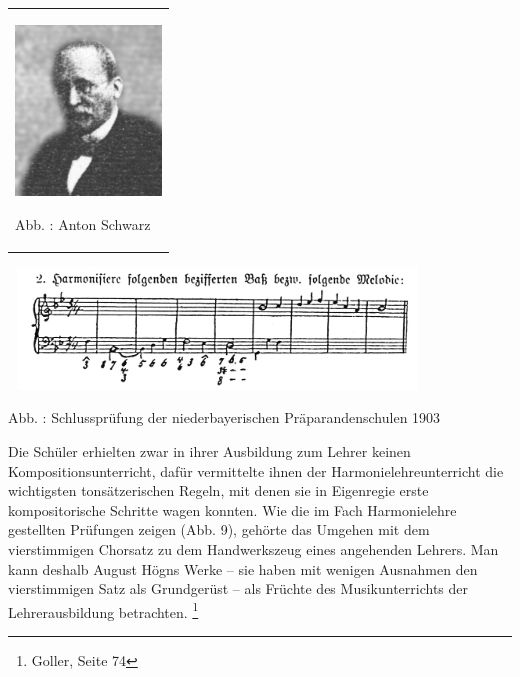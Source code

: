 \documentclass[a4paper]{article}
\newcounter{Abb}
\renewcommand\theAbb{\arabic{Abb}}
\begin{document}
\begin{center}
\begin{minipage}{4.269cm}
\begin{flushleft}
\tablefirsthead{}
\tablehead{}
\tabletail{}
\tablelasttail{}
\begin{supertabular}{m{4.0690002cm}}

\includegraphics[width=3.886cm,height=4.531cm]{pictures/zulassungsarbeit-img010.png}

Abb. \stepcounter{Abb}{\theAbb}: Anton Schwarz\\
\end{supertabular}
\end{flushleft}
\end{minipage}
\end{center}
{%
\includegraphics[width=11.088cm,height=3.258cm]{pictures/zulassungsarbeit-img011.png}
 \par}
{\centering
\label{bkm:Ref100298600}Abb. \stepcounter{Abb}{\theAbb}: Schlussprüfung
der niederbayerischen Präparandenschulen 1903
\par}

Die Schüler erhielten zwar in ihrer Ausbildung zum Lehrer keinen
Kompositionsunterricht, dafür vermittelte ihnen der
Harmonielehreunterricht die wichtigsten tonsätzerischen Regeln, mit
denen sie in Eigenregie erste kompositorische Schritte wagen konnten.
Wie die im Fach Harmonielehre gestellten Prüfungen zeigen (Abb. 9),
gehörte das Umgehen mit dem vierstimmigen Chorsatz zu dem Handwerkszeug
eines angehenden Lehrers. Man kann deshalb August Högns Werke – sie
haben mit wenigen Ausnahmen den vierstimmigen Satz als Grundgerüst –
als Früchte des Musikunterrichts der Lehrerausbildung
betrachten. \footnote{Goller, Seite 74}
\end{document}
